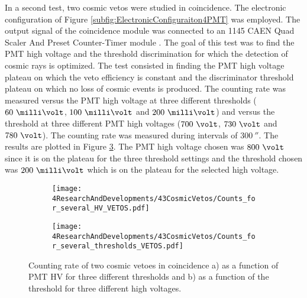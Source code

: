 In a second test, two cosmic vetos were studied in coincidence. The electronic configuration of Figure \ref{subfig:ElectronicConfiguraiton4PMT} was employed. The output signal of the coincidence module was connected to an 1145 CAEN Quad Scaler And Preset Counter-Timer module \cite{ScalerDataSheet}. The goal of this test was to find the PMT high voltage and the threshold discrimination for which the detection of cosmic rays is optimized. The test consisted in finding the PMT high voltage plateau on which the veto efficiency is constant and the discriminator threshold plateau on which no loss of cosmic events is produced. The counting rate was measured versus the PMT high voltage at three different thresholds ($60~\milli\volt$, $100~\milli\volt$ and $200~\milli\volt$) and versus the threshold at three different PMT high voltages ($700~\volt$, $730~\volt$ and $780~\volt$). The counting rate was measured during intervals of $300~\second$. The results are plotted in Figure \ref{fig:HVandThresholdsPLateaus}. The PMT high voltage chosen was $800~\volt$ since it is on the plateau for the three threshold settings and the threshold chosen was $200~\milli\volt$ which is on the plateau for the selected high voltage. 

\begin{figure}
\centering
    \begin{subfigure}[b]{1\textwidth}
    \centering
    \texttt{[image: 4ResearchAndDevelopments/43CosmicVetos/Counts\_for\_several\_HV\_VETOS.pdf]}  
    \caption{\label{subfig:HVPLateauVetos}}
    \end{subfigure}
    \hfill
    \begin{subfigure}[b]{1\textwidth}
    \centering
    \texttt{[image: 4ResearchAndDevelopments/43CosmicVetos/Counts\_for\_several\_thresholds\_VETOS.pdf]}  
    \caption{\label{subfig:ThresholdsPlateau}}
    \end{subfigure}
 \caption{Counting rate of two cosmic vetoes in coincidence a) as a function of PMT HV for three different thresholds and b) as a function of the threshold for three different high voltages.}
 \label{fig:HVandThresholdsPLateaus}
\end{figure}

